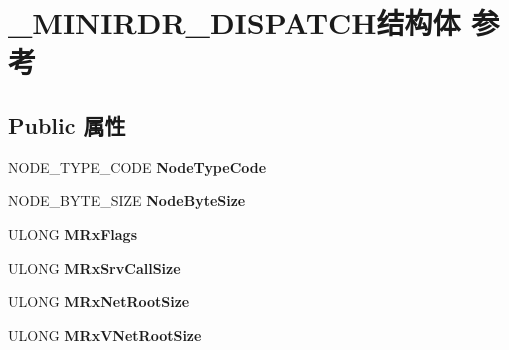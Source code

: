 \hypertarget{struct___m_i_n_i_r_d_r___d_i_s_p_a_t_c_h}{}\section{\+\_\+\+M\+I\+N\+I\+R\+D\+R\+\_\+\+D\+I\+S\+P\+A\+T\+C\+H结构体 参考}
\label{struct___m_i_n_i_r_d_r___d_i_s_p_a_t_c_h}
\subsection*{Public 属性}
\begin{DoxyCompactItemize}
\item 
\mbox{\label{struct___m_i_n_i_r_d_r___d_i_s_p_a_t_c_h_a6e24b331a9d23c8d02fea54f86a5d668}} 
N\+O\+D\+E\+\_\+\+T\+Y\+P\+E\+\_\+\+C\+O\+DE {\bfseries Node\+Type\+Code}
\item 
\mbox{\label{struct___m_i_n_i_r_d_r___d_i_s_p_a_t_c_h_adb33f4a9a7a962caf54667e947e7f51e}} 
N\+O\+D\+E\+\_\+\+B\+Y\+T\+E\+\_\+\+S\+I\+ZE {\bfseries Node\+Byte\+Size}
\item 
\mbox{\label{struct___m_i_n_i_r_d_r___d_i_s_p_a_t_c_h_ad2485919ad4217b64b8ee14f31e6eaaa}} 
U\+L\+O\+NG {\bfseries M\+Rx\+Flags}
\item 
\mbox{\label{struct___m_i_n_i_r_d_r___d_i_s_p_a_t_c_h_a56aec8101c76525c5c5021f8efdc48b0}} 
U\+L\+O\+NG {\bfseries M\+Rx\+Srv\+Call\+Size}
\item 
\mbox{\label{struct___m_i_n_i_r_d_r___d_i_s_p_a_t_c_h_a6a7fc228c73a47647c43bfd82f876320}} 
U\+L\+O\+NG {\bfseries M\+Rx\+Net\+Root\+Size}
\item 
\mbox{\label{struct___m_i_n_i_r_d_r___d_i_s_p_a_t_c_h_a75f6ca4e01c94e372f70da55fa8d6e83}} 
U\+L\+O\+NG {\bfseries M\+Rx\+V\+Net\+Root\+Size}
\item 
\mbox{\label{struct___m_i_n_i_r_d_r___d_i_s_p_a_t_c_h_a90eae5905c2340350006505b0f1b508b}} 

\end{DoxyCompactItemize}
